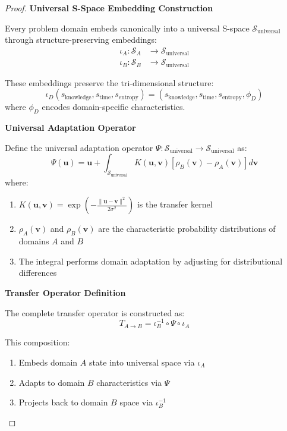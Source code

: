 \documentclass[11pt]{article}
\theoremstyle{definition}
\theoremstyle{remark}
\newcommand{\SEntropy}{\mathcal{S}}
\begin{document}
\begin{proof}
\textbf{Universal S-Space Embedding Construction}

Every problem domain embeds canonically into a universal S-space $\SEntropy_{\text{universal}}$ through structure-preserving embeddings:
\begin{align}
\iota_A: \SEntropy_A &\to \SEntropy_{\text{universal}} \\
\iota_B: \SEntropy_B &\to \SEntropy_{\text{universal}}
\end{align}

These embeddings preserve the tri-dimensional structure:
\begin{equation}
\iota_D(s_{\text{knowledge}}, s_{\text{time}}, s_{\text{entropy}}) = (s_{\text{knowledge}}, s_{\text{time}}, s_{\text{entropy}}, \phi_D)
\end{equation}
where $\phi_D$ encodes domain-specific characteristics.

\textbf{Universal Adaptation Operator}

Define the universal adaptation operator $\Psi: \SEntropy_{\text{universal}} \to \SEntropy_{\text{universal}}$ as:
\begin{equation}
\Psi(\mathbf{u}) = \mathbf{u} + \int_{\SEntropy_{\text{universal}}} K(\mathbf{u}, \mathbf{v})[\rho_B(\mathbf{v}) - \rho_A(\mathbf{v})] d\mathbf{v}
\end{equation}
where:
\begin{enumerate}
\item $K(\mathbf{u}, \mathbf{v}) = \exp\left(-\frac{\|\mathbf{u} - \mathbf{v}\|^2}{2\sigma^2}\right)$ is the transfer kernel
\item $\rho_A(\mathbf{v})$ and $\rho_B(\mathbf{v})$ are the characteristic probability distributions of domains $A$ and $B$
\item The integral performs domain adaptation by adjusting for distributional differences
\end{enumerate}

\textbf{Transfer Operator Definition}

The complete transfer operator is constructed as:
\begin{equation}
T_{A \to B} = \iota_B^{-1} \circ \Psi \circ \iota_A
\end{equation}

This composition:
\begin{enumerate}
\item Embeds domain $A$ state into universal space via $\iota_A$
\item Adapts to domain $B$ characteristics via $\Psi$
\item Projects back to domain $B$ space via $\iota_B^{-1}$
\end{enumerate}


\end{proof}
\end{document}
